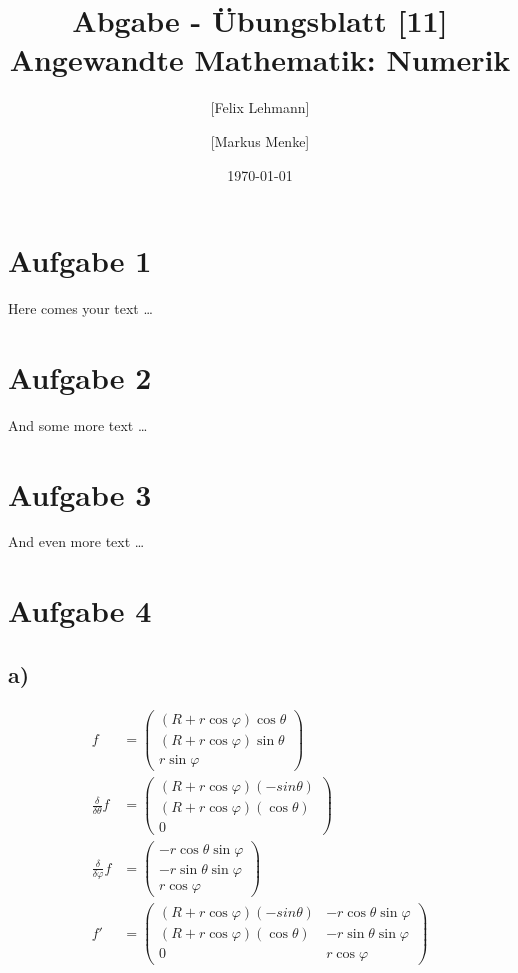 \documentclass[10pt,a4paper]{article}
\begin{document}
\title{Abgabe - Übungsblatt [11]\\
\small{Angewandte Mathematik: Numerik}}
\author{ [Felix Lehmann] \and [Markus Menke]}
\date{\today}
\maketitle

\section*{Aufgabe 1}
Here comes your text \ldots

\section*{Aufgabe 2}
And some more text \ldots

\section*{Aufgabe 3}
And even more text \ldots

\section*{Aufgabe 4}

\subsection*{a)}
\begin{align*}
f &= \begin{pmatrix}
    (R + r \cos \varphi) \cos \theta \\
    (R + r \cos \varphi) \sin \theta \\
    r \sin \varphi
\end{pmatrix}\\
\frac{\delta}{\delta\theta}f &= \begin{pmatrix}
    (R + r \cos \varphi)  ( -sin \theta) \\
    (R + r \cos \varphi)  (\cos \theta) \\
    0
\end{pmatrix}\\
\frac{\delta}{\delta\varphi}f &= \begin{pmatrix}
    - r \cos \theta \sin \varphi\\
    - r \sin \theta \sin \varphi\\
    r \cos \varphi
\end{pmatrix}\\
f' &= \begin{pmatrix}
    (R + r \cos \varphi) ( -sin \theta) & - r \cos \theta \sin \varphi \\
    (R + r \cos \varphi) (\cos \theta) & - r \sin \theta \sin \varphi\\
    0 & r \cos \varphi
\end{pmatrix}
\end{align*}
\end{document}

